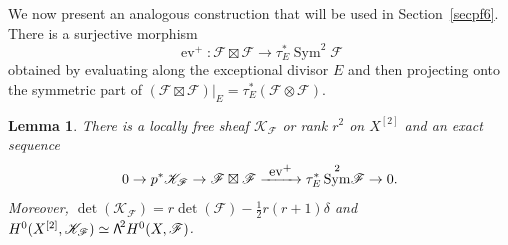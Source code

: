 \documentclass[11pt]{article}
\let\mathcal\mathscr
\newcommand\To[1]{\mathchoice{\xrightarrow{\textstyle\kern4pt#1\kern3pt}}{\stackrel{#1}{\longrightarrow}}{}{}}
\newtheorem{lemm}{Lemma}[section]
\theoremstyle{definition}
\newcommand\cF{\mathcal{F}}
\newcommand\cK{\mathcal{K}}
\let\isom\simeq
\DeclareMathOperator{\ev}{ev}
\DeclareMathOperator{\Sym}{Sym}
\newcommand\bw[1]{{\hbox{\large$\mathsf{\Lambda}$}^{\!#1}}}
\begin{document}
We now present an analogous construction that will be used in Section~\ref{secpf6}. There is a surjective morphism
\[\label{eqmorph}
\ev^+\colon \cF \boxtimes\cF\to \tau_E^*\Sym^2\!\cF
\]
obtained by evaluating along the exceptional divisor $E$ and then projecting onto the symmetric part of
$(\cF \boxtimes\cF)\vert_{ E}=\tau_E^*( \cF\otimes\cF)$.

\begin{lemm}\label{ledescend}
There is a locally free sheaf $\cK_\cF$ or rank $r^2$ on $X^{[2]}$ and an exact sequence
\begin{equation}\label{eqcK}
0\to p^*\cK_\cF \to \cF\boxtimes\cF \To{\ev^+} \tau_E^*\Sym^2\!\cF\to 0.
\end{equation}
Moreover, $\det(\cK_\cF)=r\det(\cF)- \frac12 r(r+1)\delta $ and $H^0(X^{[2]},\cK_\cF)\isom \bw2H^0(X,\cF)$.
\end{lemm}
\end{document}

